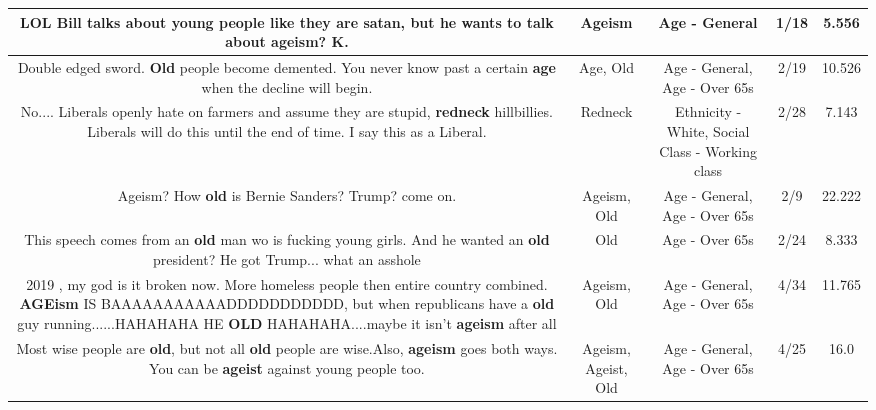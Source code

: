 \documentclass[11pt]{article}
\newlength\mylength
\begin{document}
\begin{center}
\begin{longtable}{|C{.65\mylength}|C{.30\mylength}|C{.12\mylength}|C{.12\mylength}|C{.12\mylength}|}
  \small LOL Bill talks about young people like they are satan, but he wants to talk about \textbf{ageism}? K.\normalsize   & Ageism & Age - General & 1/18 & 5.556 \\  \hline
  \small Double edged sword.  \textbf{Old} people become demented.  You never know past a certain \textbf{age} when the decline will begin.\normalsize   & Age, Old & Age - General, Age - Over 65s & 2/19 & 10.526 \\  \hline
  \small No.... Liberals openly hate on farmers and assume they are stupid, \textbf{r\textbf{edneck}} hillbillies. Liberals will do this until the end of time. I say this as a Liberal.\normalsize   & Redneck & Ethnicity - White, Social Class - Working class & 2/28 & 7.143 \\  \hline
  \small Ageism? How \textbf{old} is Bernie Sanders? Trump? come on.\normalsize   & Ageism, Old & Age - General, Age - Over 65s & 2/9 & 22.222 \\  \hline
  \small This speech comes from an \textbf{old} man wo is fucking young girls. And he wanted an \textbf{old} president? He got Trump... what an asshole\normalsize   & Old & Age - Over 65s & 2/24 & 8.333 \\  \hline
  \small 2019 , my god is it broken now. More homeless people then entire country combined. \textbf{AGEism} IS BAAAAAAAAAAADDDDDDDDDDD, but when republicans have a \textbf{old} guy running......HAHAHAHA HE \textbf{OLD} HAHAHAHA....maybe it isn't \textbf{ageism} after all\normalsize   & Ageism, Old & Age - General, Age - Over 65s & 4/34 & 11.765 \\  \hline
  \small Most wise people are \textbf{old}, but not all \textbf{old} people are wise.Also, \textbf{ageism} goes both ways. You can be \textbf{ageist} against young people too.\normalsize   & Ageism, Ageist, Old & Age - General, Age - Over 65s & 4/25 & 16.0 \\  \hline

\end{longtable}
\end{center}
\end{document}
